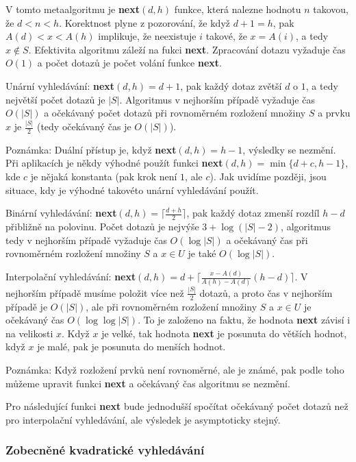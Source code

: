 \documentclass[a4paper,12pt]{article}
\begin{document}
V tomto metaalgoritmu je {\bf next$(d,h)$} funkce, která 
nalezne hodnotu $n$ takovou, že $d<n<h$. Korektnost plyne 
z pozorování, že když $d+1=h$, pak $A(d)<x<A(h)$ 
implikuje, že neexistuje $i$ takové, že $x=A(i)$, a tedy 
$x\notin S$. Efektivita algoritmu záleží na fukci {\bf next}. 
Zpracování dotazu vyžaduje čas $O(1)$ a počet 
dotazů je 
počet volání funkce {\bf next}. 

Unární vyhledávání: {\bf next$(d,h)=d+1$}, pak každý 
dotaz zvětší $d$ o $1$, a tedy největší počet 
dotazů je $|S|$. Algoritmus v nej\-horším případě 
vyžaduje čas $O(|S|)$ a očekávaný počet dotazů při 
rovnoměrném rozložení množiny $S$ a prvku $x$ je $\frac {
|S|}2$ 
(tedy očekávaný čas je $O(|S|)$). 

Poznámka: Duální přístup je, když 
{\bf next$(d,h)=h-1$}, výsled\-ky se nezmění. Při aplikacích je 
někdy výhodné použít funkci {\bf next$(d,h)=\min\{d
+c,h-1\}$}, 
kde $c$ je nějaká konstanta (pak krok není $1$, ale $c$). Jak 
uvidíme později, jsou situace, kdy je výhodné  
takovéto unární vyhledávání použít.

Binární vyhledávání: {\bf next$(d,h)=\lceil\frac {
d+h}2\rceil$}, pak 
každý dotaz zmenší rozdíl $h-d$ přibližně na polovinu. 
Počet dotazů je nejvýše $3+\log(|S|-2)$, 
algoritmus tedy v 
nejhorším případě vyžaduje čas $O(\log|S|)$ a  
očekávaný čas při rovnoměrném roz\-ložení množiny $
S$ a 
$x\in U$ je také $O(\log|S|)$.

Interpolační vyhledávání: 
{\bf next$(d,h)=d+\lceil\frac {x-A(d)}{A(h)-A(d)}(h-d)\rceil$}. V nejhorším případě 
musíme položit více než $\frac {|S|}2$ dotazů, a proto čas 
v nejhorším případě je $O(|S|)$, ale při rovnoměrném 
roz\-ložení množiny $S$ a $x\in U$ je očekávaný čas 
$O(\log\log|S|)$. To je založeno na faktu, že hodnota {\bf next }
závisí i na velikosti $x$. Když $x$ je velké, tak hodnota 
{\bf next} je posunuta do větších hodnot, když $x$ je malé, 
pak je posunuta do menších hodnot.

Poznámka: Když rozložení prvků není 
rovnoměrné, ale je zná\-mé, pak podle toho můžeme  
upravit funkci {\bf next} a očekávaný čas algoritmu se 
nezmění.

Pro následující funkci {\bf next} bude 
jednodušší spočítat očekáva\-ný počet dotazů než 
pro interpolační vyhledávání, ale výsledek je 
asymptoticky stejný.

\subsubsection{Zobecněné kvadratické vyhledávání}
\end{document}
